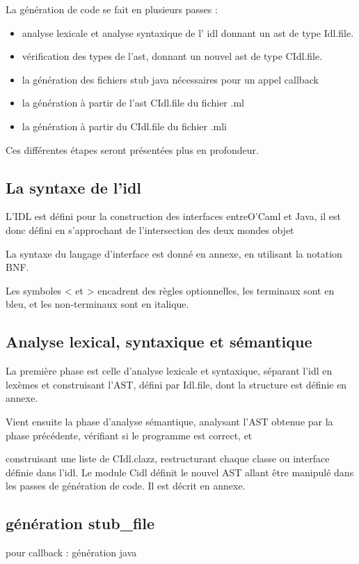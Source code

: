 \documentclass[a4paper, 11pt, notitlepage]{article}
\begin{document}
La génération de code se fait en plusieurs passes :
\begin{itemize}
\item analyse lexicale et analyse syntaxique de l' idl donnant un
  ast de type Idl.file.
\item vérification des types de l'ast, donnant un nouvel ast de type
  CIdl.file.
\item la génération des fichiers stub java nécessaires pour un appel callback 
\item la génération à partir de l'ast CIdl.file du fichier .ml
\item la génération à partir du CIdl.file du fichier .mli
\end{itemize}
Ces différentes étapes seront présentées plus en profondeur.


\subsection{La syntaxe de l'idl}
L'IDL est défini pour la construction des interfaces entreO'Caml et
Java, il est donc défini en s'approchant de l'intersection des deux
mondes objet

La syntaxe du langage d'interface est donné en annexe, en utilisant la
notation BNF.

Les symboles < et > encadrent des règles optionnelles,
les terminaux sont en bleu, et les non-terminaux sont en italique.


\subsection{Analyse lexical, syntaxique et sémantique}
La première phase est celle d'analyse lexicale et syntaxique,
séparant l'idl en lexèmes et construisant l'AST, défini par Idl.file,
dont la structure est définie en annexe.

Vient ensuite la phase d'analyse sémantique, analysant l'AST obtenue par la
phase précédente, vérifiant si le programme est correct, et

construisant une liste de CIdl.clazz, restructurant chaque classe ou interface définie dans l'idl. 
Le module Cidl définit le nouvel AST allant être manipulé dans les passes de
génération de code. Il est décrit en annexe.

\subsection{génération stub\_file}
pour callback : génération java
\end{document}
